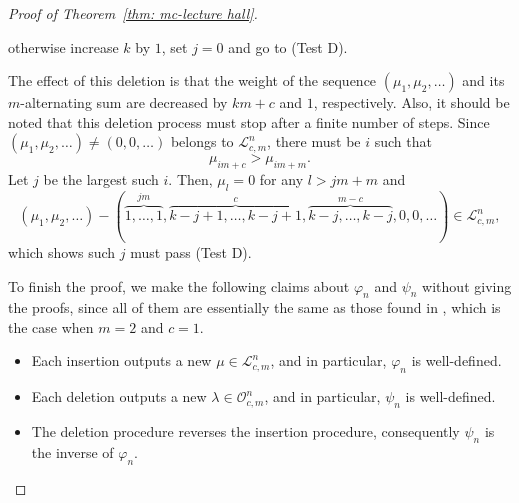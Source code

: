 \documentclass[11pt,reqno]{amsart}
\numberwithin{equation}{section}
\theoremstyle{plain}
\theoremstyle{definition}
\newcommand{\OO}{\mathcal{O}}
\newcommand{\LL}{\mathcal{L}}
\begin{document}
\begin{proof}[Proof of Theorem~\ref{thm: mc-lecture hall}]
\begin{framed}
 \qquad \qquad  otherwise increase $k$ by $1$, set $j=0$ and go to (Test D).\hfill
\end{framed}

The effect of this deletion is that the weight of the sequence $(\mu_1,\mu_2,\ldots)$ and its $m$-alternating sum are decreased by $km+c$ and $1$, respectively. Also, it should be noted that this deletion process must stop after a finite number of steps. Since $(\mu_1, \mu_2,\ldots )\neq (0,0,\ldots)$ belongs to $\LL_{c,m}^n$, there must be  $i$ such that
\begin{equation*}
\mu_{i m+c}>\mu_{i m+m}. 
\end{equation*}
Let $j$ be the largest such $i$. Then, $\mu_{l}=0$ for any $l>jm+m$ and
\begin{equation*}
(\mu_1, \mu_2, \ldots)- (\overbrace{1,\ldots,1}^{jm},\overbrace{k-j+1,\ldots, k-j+1}^{c},\overbrace{k-j,\ldots, k-j}^{m-c},0,0,\ldots) \in \LL_{c,m}^n,
\end{equation*}
which shows such $j$ must pass (Test D).



To finish the proof, we make the following claims about $\varphi_n$ and $\psi_n$ without giving the proofs, since all of them are essentially the same as those found in \cite{Yee}, which is the case when $m=2$ and $c=1$.
\begin{itemize}
	\item Each insertion outputs a new $\mu\in\LL_{c,m}^n$, and in particular, $\varphi_n$ is well-defined.
	\item Each deletion outputs a new $\lambda\in\OO_{c,m}^n$, and in particular, $\psi_n$ is well-defined.
	\item The deletion procedure reverses the insertion procedure, consequently $\psi_n$ is the inverse of $\varphi_n$. 
\end{itemize}
\end{proof}
\end{document}

